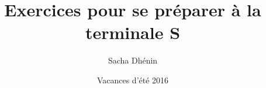 

\usepackage{parcolumns}

        \title {Exercices pour se préparer à la terminale S}

        \author{Sacha Dhénin}
        \date{Vacances d'été 2016}
        
\usepackage{amsthm}





\maketitle
\newpage
\thispagestyle{empty}


\def\myscale{.75} %
\newcommand{\myfigure}[2]{  %
\def\myscale{#1}\begin{center}\footnotesize{#2}\end{center}}
\newcommand{\E}{(-4,-1) rectangle (4,4)}
\newcommand{\A}{(0,0) ++(135:2) circle (1.9)}
\newcommand{\B}{(0,0) ++(45:2) circle (1.9)}

\setcounter{tocdepth}{4}
\tableofcontents

\newpage

 \newpage
 
 
 

%

